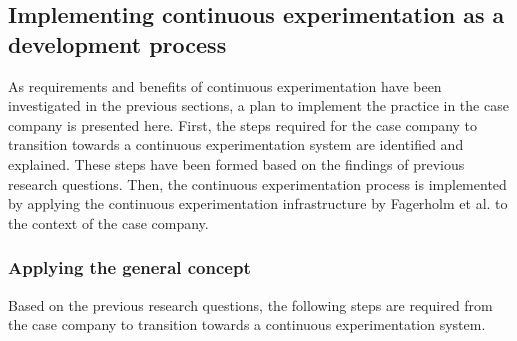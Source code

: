 \documentclass[english]{tktltiki2}
\theoremstyle{definition}
\theoremstyle{remark}
\begin{document}


\subsection{Implementing continuous experimentation as a development process}
As requirements and benefits of continuous experimentation have been investigated in the previous sections, a plan to implement the practice in the case company is presented here. First, the steps required for the case company to transition towards a continuous experimentation system are identified and explained. These steps have been formed based on the findings of previous research questions. Then, the continuous experimentation process is implemented by applying the continuous experimentation infrastructure by Fagerholm et al. \cite{fagerholm2014building} to the context of the case company. 
\subsubsection{Applying the general concept}


Based on the previous research questions, the following steps are required from the case company to transition towards a continuous experimentation system.
\end{document}
